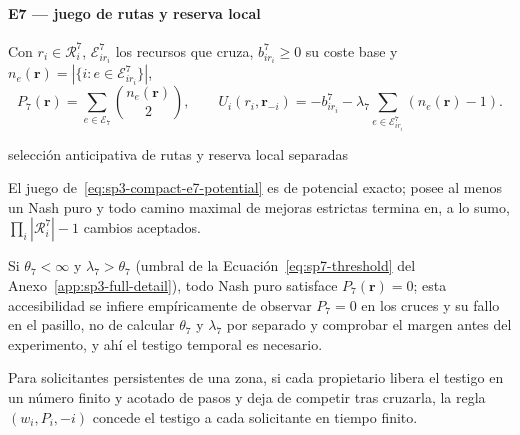 \paragraph{E7 --- juego de rutas y reserva local}
Con $r_i\in\mathcal R_i^7$, $\mathcal E_{ir_i}^7$ los recursos que cruza,
$b_{ir_i}^7\geq0$ su coste base y $n_e(\boldsymbol r)=|\{i:e\in\mathcal E_{ir_i}^7\}|$,
\begin{equation}
 P_7(\boldsymbol r)=\sum_{e\in\mathcal E_7}\binom{n_e(\boldsymbol r)}{2},\qquad
 U_i(r_i,\boldsymbol r_{-i})=-b_{ir_i}^7
 -\lambda_7\sum_{e\in\mathcal E_{ir_i}^7}(n_e(\boldsymbol r)-1).
 \label{eq:sp3-compact-e7-potential}
\end{equation}

\begin{contribucion}{selección anticipativa de rutas y reserva local separadas}
\begin{teorema}
\label{thm:sp3-compact-e7-potential}
El juego de~\eqref{eq:sp3-compact-e7-potential} es de potencial exacto; posee al menos un Nash puro y todo camino maximal de mejoras estrictas termina en, a lo sumo, $\prod_i|\mathcal R_i^7|-1$ cambios aceptados.
\end{teorema}
\begin{proposicion}
\label{prop:sp3-compact-e7-conflict-free}
Si $\theta_7<\infty$ y $\lambda_7>\theta_7$ (umbral de la Ecuación~\eqref{eq:sp7-threshold} del Anexo~\ref{app:sp3-full-detail}), todo Nash puro satisface $P_7(\boldsymbol r)=0$; esta accesibilidad se infiere empíricamente de observar $P_7=0$ en los cruces y su fallo en el pasillo, no de calcular $\theta_7$ y $\lambda_7$ por separado y comprobar el margen antes del experimento, y ahí el testigo temporal es necesario.
\end{proposicion}
\begin{proposicion}
\label{prop:sp3-compact-e7-no-starvation}
Para solicitantes persistentes de una zona, si cada propietario libera el testigo en un número finito y acotado de pasos y deja de competir tras cruzarla, la regla $(w_i,P_i,-i)$ concede el testigo a cada solicitante en tiempo finito.
\end{proposicion}
\end{contribucion}

